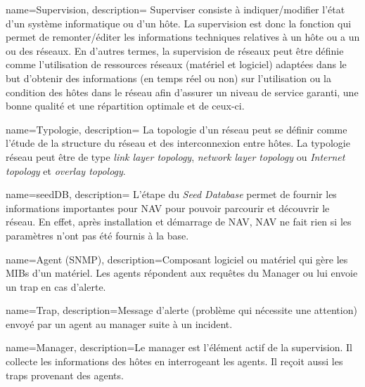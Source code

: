 


{
name=Supervision,
description={
Superviser consiste à indiquer/modifier l'état d'un système informatique ou d'un hôte. La supervision  est donc la fonction qui permet de remonter/éditer les informations techniques relatives à un hôte ou a un ou des réseaux. En d'autres termes, la supervision de réseaux peut être définie comme l'utilisation de ressources réseaux (matériel et logiciel) adaptées dans le but d'obtenir des informations (en temps réel ou non) sur l'utilisation ou la condition des hôtes dans le réseau  afin d'assurer un niveau de service garanti, une bonne qualité et une répartition optimale et de ceux-ci.}
}

{
name=Typologie,
description={
La topologie d'un réseau peut se définir comme l'étude de la structure du réseau et des interconnexion entre hôtes. La typologie réseau peut être de type \emph{link layer topology}, \emph{network layer topology} ou \emph{Internet topology} et \emph{overlay topology}.}
}

{
name=seedDB,
description={
L'étape du \emph{Seed Database} permet de fournir les informations importantes pour NAV pour pouvoir parcourir et découvrir le réseau. En effet, après installation et démarrage de NAV, NAV ne fait rien si les paramètres n'ont pas été fournis à la base.}
}

{
name=Agent (SNMP),
description={Composant logiciel ou matériel qui gère les MIBs d'un matériel. Les agents répondent aux requêtes du Manager ou lui envoie un trap en cas d'alerte.}
}

{
name=Trap,
description={Message d'alerte (problème qui nécessite une attention) envoyé par un agent au manager suite à un incident.}
}

{
name=Manager,
description={Le manager est l'élément actif de la supervision. Il collecte les informations des hôtes en interrogeant les agents. Il reçoit aussi les traps provenant des agents. }
}

